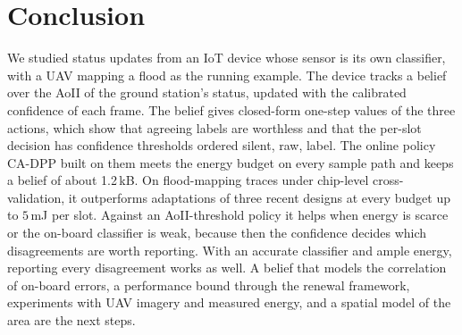 \section{Conclusion}\label{sec:concl}
We studied status updates from an IoT device whose sensor is its own classifier, with a UAV mapping a flood as the running example. The device tracks a belief over the AoII of the ground station's status, updated with the calibrated confidence of each frame. The belief gives closed-form one-step values of the three actions, which show that agreeing labels are worthless and that the per-slot decision has confidence thresholds ordered silent, raw, label. The online policy CA-DPP built on them meets the energy budget on every sample path and keeps a belief of about 1.2\,kB. On flood-mapping traces under chip-level cross-validation, it outperforms adaptations of three recent designs at every budget up to $5$\,mJ per slot. Against an AoII-threshold policy it helps when energy is scarce or the on-board classifier is weak, because then the confidence decides which disagreements are worth reporting. With an accurate classifier and ample energy, reporting every disagreement works as well. A belief that models the correlation of on-board errors, a performance bound through the renewal framework, experiments with UAV imagery and measured energy, and a spatial model of the area are the next steps.
